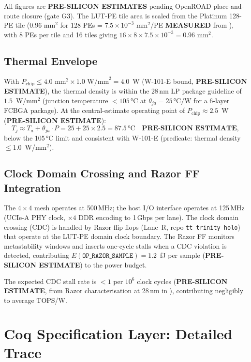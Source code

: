 All figures are \textbf{PRE-SILICON ESTIMATES} pending OpenROAD
place-and-route closure (gate G3).  The LUT-PE tile area is scaled from
the Platinum 128-PE tile (\(0.96\text{ mm}^{2}\) for 128 PEs =
\(7.5 \times 10^{-3}\text{ mm}^{2}\)/PE \textbf{MEASURED} from
\cite{platinum_lut_pe_2026}), with 8 PEs per tile and
16 tiles giving \(16 \times 8 \times 7.5 \times 10^{-3} = 0.96\text{ mm}^{2}\).

\subsection{Thermal Envelope}

With \(P_{\mathrm{chip}} \leq 4.0\text{ mm}^{2} \times 1.0\text{ W/mm}^{2} = 4.0\)~W
(W-101-E bound, \textbf{PRE-SILICON ESTIMATE}), the thermal density is within
the 28\,nm LP package guideline of \(1.5\)~W/mm\(^{2}\) (junction temperature
\(< 105\,\text{°C}\) at \(\theta_{ja} = 25\,\text{°C/W}\) for a 6-layer
FCBGA package).  At the central-estimate operating point of
\(P_{\mathrm{chip}} \approx 2.5\)~W (\textbf{PRE-SILICON ESTIMATE}):
\[
  T_{j} \approx T_{a} + \theta_{ja} \cdot P = 25 + 25 \times 2.5 = 87.5\,\text{°C}
  \quad \textbf{PRE-SILICON ESTIMATE},
\]
below the 105\,°C limit and consistent with W-101-E
(predicate: thermal density \(\leq 1.0\)~W/mm\(^{2}\)).

\subsection{Clock Domain Crossing and Razor FF Integration}

The \(4 \times 4\) mesh operates at 500\,MHz; the host I/O interface operates
at 125\,MHz (UCIe-A PHY clock, \(\times 4\) DDR encoding to 1\,Gbps per lane).
The clock domain crossing (CDC) is handled by Razor flip-flops
(Lane~R, repo \texttt{tt-trinity-holo}) that operate at the LUT-PE domain
clock boundary.  The Razor FF monitors metastability windows and inserts
one-cycle stalls when a CDC violation is detected, contributing
\(E(\mathtt{OP\_RAZOR\_SAMPLE}) = 1.2\)~fJ per sample
(\textbf{PRE-SILICON ESTIMATE}) to the power budget.

The expected CDC stall rate is \(< 1\) per \(10^{6}\) clock cycles
(\textbf{PRE-SILICON ESTIMATE}, from Razor characterisation at 28\,nm
in \cite{platinum_lut_pe_2026}), contributing negligibly to average TOPS/W.

\section{Coq Specification Layer: Detailed Trace}
\label{sec:coq_trace}

